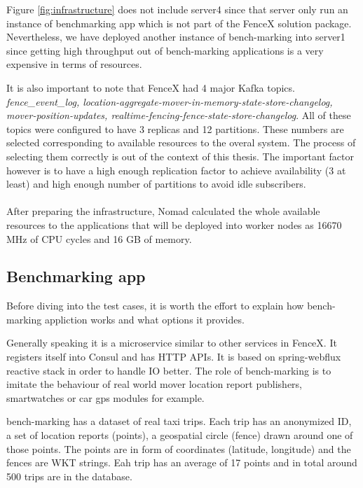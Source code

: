 \documentclass[a4]{report}
\begin{document}
        Figure \ref{fig:infrastructure} does not include server4 since that server only run an instance of benchmarking app
        which is not part of the FenceX solution package.
        Nevertheless, we have deployed another instance of bench-marking into server1 since getting high throughput out of
        bench-marking applications is a very expensive in terms of resources.

        It is also important to note that FenceX had 4 major Kafka topics.
        \textit{fence\_event\_log, location-aggregate-mover-in-memory-state-store-changelog, mover-position-updates,
            realtime-fencing-fence-state-store-changelog}.
        All of these topics were configured to have 3 replicas and 12 partitions.
        These numbers are selected corresponding to available resources to the overal system.
        The process of selecting them correctly is out of the context of this thesis.
        The important factor however is to have a high enough replication factor to achieve availability (3 at least) and
        high enough number of partitions to avoid idle subscribers.

        \paragraph{}
        After preparing the infrastructure, Nomad calculated the whole available resources to the applications that will
        be deployed into worker nodes as 16670 MHz of CPU cycles and 16 GB of memory.

        \subsection{Benchmarking app}
        Before diving into the test cases, it is worth the effort to explain how bench-marking appliction works and what
        options it provides.

        Generally speaking it is a microservice similar to other services in FenceX.
        It registers itself into Consul and has HTTP APIs.
        It is based on spring-webflux reactive stack in order to handle IO better.
        The role of bench-marking is to imitate the behaviour of real world mover location report publishers,
        smartwatches or car gps modules for example.

        bench-marking has a dataset of real taxi trips.
        Each trip has an anonymized ID, a set of location reports (points), a geospatial circle (fence) drawn around one
        of those points.
        The points are in form of coordinates (latitude, longitude) and the fences are WKT strings.
        Eah trip has an average of 17 points and in total around 500 trips are in the database.
\end{document}
